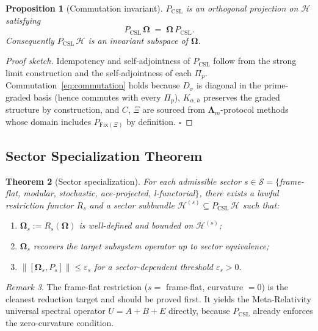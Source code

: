 \documentclass[12pt,a4paper]{article}
\theoremstyle{plain}
\newtheorem{theorem}{Theorem}[section]
\newtheorem{proposition}[theorem]{Proposition}
\theoremstyle{definition}
\theoremstyle{remark}
\newtheorem{remark}[theorem]{Remark}
\newcommand{\Hil}{\mathcal{H}}
\newcommand{\Pcsl}{P_{\mathrm{CSL}}}
\newcommand{\Dsig}{D_{\sigma}}
\newcommand{\Kalpha}{K_{\alpha,h}}
\newcommand{\Lam}{\boldsymbol{\Lambda}_m}
\newcommand{\norm}[1]{\left\lVert #1 \right\rVert}
\newcommand{\eps}{\varepsilon}
\begin{document}
\begin{proposition}[Commutation invariant]
\label{prop:commutation}
$\Pcsl$ is an orthogonal projection on $\Hil$ satisfying
\begin{equation}
  \Pcsl\, \boldsymbol{\Omega} \;=\; \boldsymbol{\Omega}\, \Pcsl.
  \label{eq:commutation}
\end{equation}
Consequently $\Pcsl\, \Hil$ is an invariant subspace of
$\boldsymbol{\Omega}$.
\end{proposition}

\begin{proof}[Proof sketch]
Idempotency and self-adjointness of $\Pcsl$ follow from the strong
limit construction and the self-adjointness of each $\Pi_p$.
Commutation~\eqref{eq:commutation} holds because $\Dsig$ is diagonal
in the prime-graded basis (hence commutes with every $\Pi_p$),
$\Kalpha$ preserves the graded structure by construction,
and $C$, $\Xi$ are sourced from $\Lam$-protocol methods whose
domain includes $P_{\mathrm{Fix}(\Xi)}$ by definition. $\square$
\end{proof}

\subsection{Sector Specialization Theorem}
\label{sec:spec-thm}

\begin{theorem}[Sector specialization]
\label{thm:specialization}
For each admissible sector
$s \in \mathcal{S} = \{$frame-flat, modular, stochastic,
ace-projected, \mbox{l-functorial}$\}$,
there exists a lawful restriction functor $R_s$ and a
sector subbundle $\Hil^{(s)} \subseteq \Pcsl\, \Hil$ such that:
\begin{enumerate}[label=(\roman*)]
  \item $\boldsymbol{\Omega}_s := R_s(\boldsymbol{\Omega})$ is
        well-defined and bounded on $\Hil^{(s)}$;
  \item $\boldsymbol{\Omega}_s$ recovers the target subsystem operator
        up to sector equivalence;
  \item $\norm{[\boldsymbol{\Omega}_s, P_s]} \le \eps_s$ for a
        sector-dependent threshold $\eps_s > 0$.
\end{enumerate}
\end{theorem}

\begin{remark}
The frame-flat restriction ($s =$ frame-flat, curvature $= 0$) is the
cleanest reduction target and should be proved first. It yields the
Meta-Relativity universal spectral operator $U = A + B + E$ directly,
because $\Pcsl$ already enforces the zero-curvature condition.
\end{remark}
\end{document}
